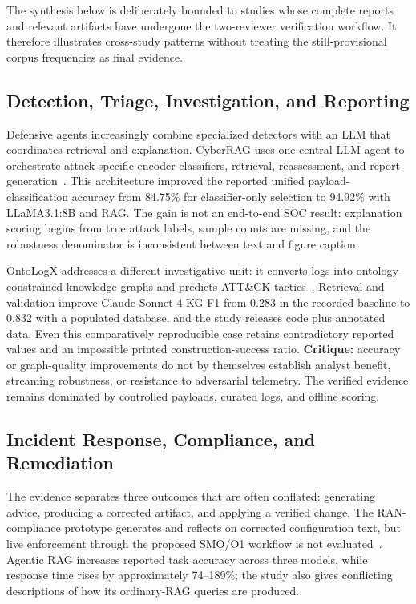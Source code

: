 The synthesis below is deliberately bounded to studies whose complete reports and relevant artifacts have undergone the two-reviewer verification workflow. It therefore illustrates cross-study patterns without treating the still-provisional corpus frequencies as final evidence.

\subsection{Detection, Triage, Investigation, and Reporting}

Defensive agents increasingly combine specialized detectors with an LLM that coordinates retrieval and explanation. CyberRAG uses one central LLM agent to orchestrate attack-specific encoder classifiers, retrieval, reassessment, and report generation~\cite{R0447_Blefari_2026}. This architecture improved the reported unified payload-classification accuracy from 84.75\% for classifier-only selection to 94.92\% with LLaMA3.1:8B and RAG. The gain is not an end-to-end SOC result: explanation scoring begins from true attack labels, sample counts are missing, and the robustness denominator is inconsistent between text and figure caption.

OntoLogX addresses a different investigative unit: it converts logs into ontology-constrained knowledge graphs and predicts ATT\&CK tactics~\cite{R0365_Cotti_2026}. Retrieval and validation improve Claude Sonnet 4 KG F1 from 0.283 in the recorded baseline to 0.832 with a populated database, and the study releases code plus annotated data. Even this comparatively reproducible case retains contradictory reported values and an impossible printed construction-success ratio. \textbf{Critique:} accuracy or graph-quality improvements do not by themselves establish analyst benefit, streaming robustness, or resistance to adversarial telemetry. The verified evidence remains dominated by controlled payloads, curated logs, and offline scoring.

\subsection{Incident Response, Compliance, and Remediation}

The evidence separates three outcomes that are often conflated: generating advice, producing a corrected artifact, and applying a verified change. The RAN-compliance prototype generates and reflects on corrected configuration text, but live enforcement through the proposed SMO/O1 workflow is not evaluated~\cite{R0340_Chatzimiltis_2026}. Agentic RAG increases reported task accuracy across three models, while response time rises by approximately 74--189\%; the study also gives conflicting descriptions of how its ordinary-RAG queries are produced.

